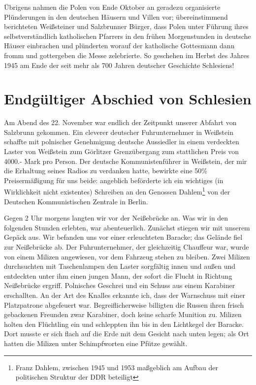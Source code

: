 Übrigens nahmen die Polen von Ende Oktober an geradezu organisierte Plünderungen in den deutschen Häusern und Villen vor; übereinstimmend berichteten Weißsteiner und Salzbrunner Bürger, dass Polen unter Führung ihres selbstverständlich katholischen Pfarrers in den frühen Morgenstunden in deutsche Häuser einbrachen und plünderten worauf der katholische Gottesmann dann fromm und gottergeben die Messe zelebrierte. So geschehen im Herbst des Jahres 1945 am Ende der seit mehr als 700 Jahren deutscher Geschichte Schlesiens!

\section{Endgültiger Abschied von Schlesien}
Am Abend des 22. November war endlich der Zeitpunkt unserer Abfahrt von Salzbrunn gekommen. Ein cleverer deutscher Fuhrunternehmer in Weißstein schaffte mit polnischer Genehmigung deutsche Aussiedler in einem verdeckten Laster von Weißstein zum Görlitzer Grenzübergang zum stattlichen Preis von 4000.- Mark pro Person. Der deutsche Kommunistenführer in Weißstein, der mir die Erhaltung seines Radios zu verdanken hatte, bewirkte eine 50\% Preisermäßigung für uns beide: angeblich beförderte ich ein wichtiges (in Wirklichkeit nicht existentes) Schreiben an den Genossen Dahlem\footnote{Franz Dahlem, zwischen 1945 und 1953 maßgeblich am Aufbau der politischen Struktur der DDR beteiligt} von der Deutschen Kommunistischen Zentrale in Berlin.

 Gegen 2 Uhr morgens langten wir vor der Neißebrücke an. Was wir in den folgenden Stunden erlebten, war abenteuerlich. Zunächst stiegen wir mit unserem Gepäck aus. Wir befanden uns vor einer erleuchteten Baracke; das Gelände fiel zur Neißebrücke ab. Der Fuhrunternehmer, der gleichzeitig Chauffeur war, wurde von einem Milizen angewiesen, vor dem Fahrzeug stehen zu bleiben. Zwei Milizen durchsuchten mit Taschenlampen den Laster sorgfältig innen und außen und entdeckten unter ihm einen jungen Mann, der sofort die Flucht in Richtung Neißebrücke ergriff. Polnisches Geschrei und ein Schuss aus einem Karabiner erschallten. An der Art des Knalles erkannte ich, dass der Warnschuss mit einer Platzpatrone abgefeuert war. Begreiflicherweise billigten die Russen ihren frisch gebackenen Freunden zwar Karabiner, doch keine scharfe Munition zu. Milizen holten den Flüchtling ein und schleppten ihn bis in den Lichtkegel der Baracke. Dort musste er sich flach auf die Erde mit dem Gesicht nach unten legen; als Ort hatten die Milizen unter Schimpfworten eine Pfütze gewählt.

